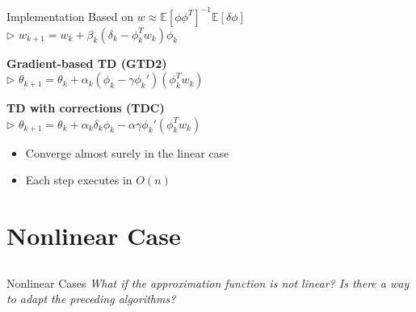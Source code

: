 \documentclass[11pt]{beamer}
\begin{document}
\begin{frame}{Implementation}
	Based on $w \approx \mathbb{E}[\phi\phi^T]^{-1}\mathbb{E}[\delta\phi]$ \\
	\qquad $\triangleright$ $w_{k+1} = w_k + \beta_k(\delta_k - \phi_k^Tw_k)\phi_k$
	
	\vspace{1em}
	
	\textbf{Gradient-based TD (GTD2)} \\
	\qquad $\triangleright$ $\theta_{k+1} = \theta_k + \alpha_k(\phi_k - \gamma\phi_k')(\phi_k^Tw_k)$
	
	\vspace{1em}
	
	\textbf{TD with corrections (TDC)} \\
	\qquad $\triangleright$ $\theta_{k+1} = \theta_k + \alpha_k\delta_k\phi_k - \alpha\gamma\phi_k'(\phi_k^Tw_k)$
	
	\vspace{1em}
	
	\pause
	\begin{itemize}
		\item Converge almost surely in the linear case
		\item Each step executes in $O(n)$
	\end{itemize}
\end{frame}

\section{Nonlinear Case}
\subsection{}

\begin{frame}{Nonlinear Cases}
	\textit{What if the approximation function is not linear? Is there a way to adapt the preceding algorithms?}
\end{frame}
\end{document}
